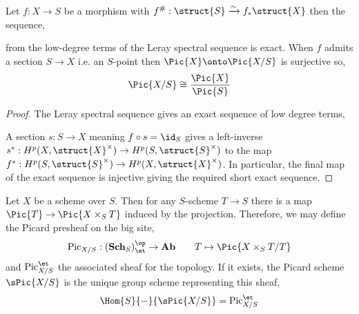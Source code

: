\begin{lemma}
Let $f : X \to S$ be a morphism with $f^\# : \struct{S} \xrightarrow{\sim} f_* \struct{X}$ then the sequence,
\begin{center}
\end{center}
from the low-degree terms of the Leray spectral sequence is exact. When $f$ admits a section $S \to X$ i.e. an $S$-point then $\Pic{X} \onto \Pic{X/S}$ is surjective so,
\[ \Pic{X/S} \cong \frac{\Pic{X}}{\Pic{S}} \]
\end{lemma}

\begin{proof}
The Leray spectral sequence gives an exact sequence of low degree terms,
\begin{center}
\end{center}
A section $s : S \to X$ meaning $f \circ s = \id_S$ gives a left-inverse $s^* : H^p(X, \struct{X}^\times) \to H^p(S, \struct{S}^\times)$ to the map $f^* : H^p(S, \struct{S}^\times) \to H^p(X, \struct{X}^\times)$. In particular, the final map of the exact sequence is injective giving the required short exact sequence.
\end{proof}


\begin{defn}
Let $X$ be a scheme over $S$. Then for any $S$-scheme $T \to S$ there is a map $\Pic{T} \to \Pic{X \times_S T}$ induced by the projection. Therefore, we may define the Picard presheaf on the big \etale site,
\[ \mathrm{Pic}_{X/S} : (\mathbf{Sch}_S)^{\op}_{\et} \to \mathbf{Ab} \quad \quad T \mapsto \Pic{X \times_S T / T} \]
and $\mathrm{Pic}_{X/S}^{\et}$ the associated sheaf for the \etale topology. If it exists, the Picard scheme $\sPic{X/S}$ is the unique group scheme representing this sheaf,
\[ \Hom{S}{-}{\sPic{X/S}} = \mathrm{Pic}_{X/S}^{\et} \] 
\end{defn}

